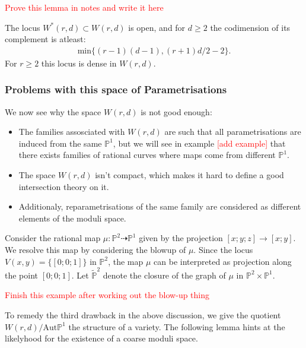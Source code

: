 \begin{lemma}
    \textcolor{red}{Prove this lemma in notes and write it here}
\end{lemma}

\begin{proposition}
    The locus $W^{*}(r,d) \subset W(r,d)$ is open, and for $d \geq 2$ the codimension of its complement is atleast:
    \begin{align*}
        \text{min}\{(r-1)(d-1),(r+1)d/2 - 2\}.
    \end{align*}
    For $r \geq 2$ this locus is dense in $W(r,d)$.
\end{proposition}

%

\subsubsection{Problems with this space of Parametrisations}
We now see why the space $W(r,d)$ is not good enough:
\begin{itemize}
    \item The families assosciated with $W(r,d)$ are such that all parametrisations are induced from the same $\mathbb{P}^{1}$, but we will see in example \textcolor{red}{[add example]} that there exists families of rational curves where maps come from different $\mathbb{P}^{1}$.
    \item The space $W(r,d)$ isn't compact, which makes it hard to define a good intersection theory on it.
    \item Additionaly, reparametrisations of the same family are considered as different elements of the moduli space.
\end{itemize}

\begin{example}
    Consider the rational map $\mu: \mathbb{P}^{2} \dashrightarrow \mathbb{P}^{1}$ given by the projection $[x;y;z] \to [x;y]$. 
    We resolve this map by considering the blowup of $\mu$.
    Since the locus $V(x,y) = \{[0;0;1]\}$ in $\mathbb{P}^{2}$, the map $\mu$ can be interpreted as projection along the point $[0;0;1]$.
    Let $\tilde{\mathbb{P}}^{2}$ denote the closure of the graph of $\mu$ in $\mathbb{P}^{2} \times \mathbb{P}^{1}$.
    \par \textcolor{red}{Finish this example after working out the blow-up thing}
\end{example}
\par To remedy the third drawback in the above discussion, we give the quotient $W(r,d)/\text{Aut}\mathbb{P}^{1}$ the structure of a variety.
The following lemma hints at the likelyhood for the existence of a coarse moduli space.

